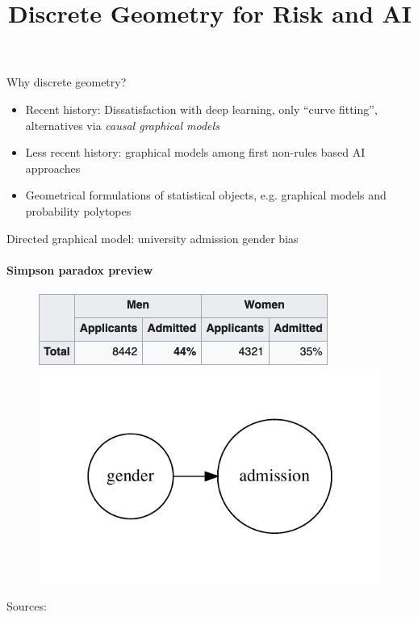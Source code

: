 


\title{Discrete Geometry for Risk and AI}

\maketitle


\begin{frame}{Why discrete geometry?}
  \begin{itemize}
    \item Recent history: Dissatisfaction with deep learning, only ``curve fitting'', alternatives via \emph{causal graphical models} \cite{pearl2019limitations}
    \item Less recent history: graphical models among first non-rules based AI approaches \cite{darwiche2009modeling}
    \item Geometrical formulations of statistical objects, e.g. graphical models and probability polytopes\newline
  \end{itemize}
\end{frame}


\begin{frame}{Directed graphical model: university admission gender bias}
  \framesubtitle{Simpson paradox preview}

  \begin{figure}[ht]
    \centering
            \includegraphics[height=0.15\textwidth]{graphics/berkeley}
            \includegraphics[height=0.4\textwidth]{graphics/admission_original}

    \end{figure}
    Sources: \cite{simpson-wikipedia} \cite{freedman1998statistics}
\end{frame}

